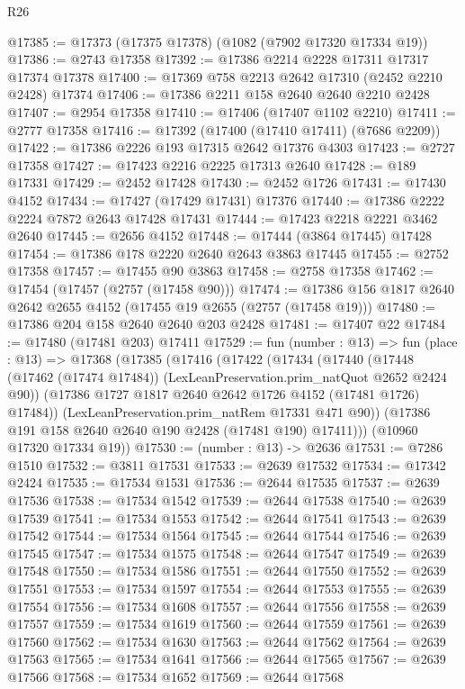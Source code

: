 \begin{lexlean}{R26}
\begin{coremodule}
@17385 := @17373 (@17375 @17378) (@1082 (@7902 @17320 @17334 @19))
@17386 := @2743 @17358
@17392 := @17386 @2214 @2228 @17311 @17317 @17374 @17378
@17400 := @17369 @758 @2213 @2642 @17310 (@2452 @2210 @2428) @17374
@17406 := @17386 @2211 @158 @2640 @2640 @2210 @2428
@17407 := @2954 @17358
@17410 := @17406 (@17407 @1102 @2210)
@17411 := @2777 @17358
@17416 := @17392 (@17400 (@17410 @17411) (@7686 @2209))
@17422 := @17386 @2226 @193 @17315 @2642 @17376 @4303
@17423 := @2727 @17358
@17427 := @17423 @2216 @2225 @17313 @2640
@17428 := @189 @17331
@17429 := @2452 @17428
@17430 := @2452 @1726
@17431 := @17430 @4152
@17434 := @17427 (@17429 @17431) @17376
@17440 := @17386 @2222 @2224 @7872 @2643 @17428 @17431
@17444 := @17423 @2218 @2221 @3462 @2640
@17445 := @2656 @4152
@17448 := @17444 (@3864 @17445) @17428
@17454 := @17386 @178 @2220 @2640 @2643 @3863 @17445
@17455 := @2752 @17358
@17457 := @17455 @90 @3863
@17458 := @2758 @17358
@17462 := @17454 (@17457 (@2757 (@17458 @90)))
@17474 := @17386 @156 @1817 @2640 @2642 @2655 @4152 (@17455 @19 @2655 (@2757 (@17458 @19)))
@17480 := @17386 @204 @158 @2640 @2640 @203 @2428
@17481 := @17407 @22
@17484 := @17480 (@17481 @203) @17411
@17529 := fun (number : @13) =>
  fun (place : @13) =>
  @17368
    (@17385
      (@17416
        (@17422
          (@17434
            (@17440
              (@17448 (@17462 (@17474 @17484)) (LexLeanPreservation.prim_natQuot @2652 @2424 @90))
              (@17386 @1727 @1817 @2640 @2642 @1726 @4152 (@17481 @1726) @17484))
            (LexLeanPreservation.prim_natRem @17331 @471 @90))
          (@17386 @191 @158 @2640 @2640 @190 @2428 (@17481 @190) @17411)))
      (@10960 @17320 @17334 @19))
@17530 := (number : @13) -> @2636
@17531 := @7286 @1510
@17532 := @3811 @17531
@17533 := @2639 @17532
@17534 := @17342 @2424
@17535 := @17534 @1531
@17536 := @2644 @17535
@17537 := @2639 @17536
@17538 := @17534 @1542
@17539 := @2644 @17538
@17540 := @2639 @17539
@17541 := @17534 @1553
@17542 := @2644 @17541
@17543 := @2639 @17542
@17544 := @17534 @1564
@17545 := @2644 @17544
@17546 := @2639 @17545
@17547 := @17534 @1575
@17548 := @2644 @17547
@17549 := @2639 @17548
@17550 := @17534 @1586
@17551 := @2644 @17550
@17552 := @2639 @17551
@17553 := @17534 @1597
@17554 := @2644 @17553
@17555 := @2639 @17554
@17556 := @17534 @1608
@17557 := @2644 @17556
@17558 := @2639 @17557
@17559 := @17534 @1619
@17560 := @2644 @17559
@17561 := @2639 @17560
@17562 := @17534 @1630
@17563 := @2644 @17562
@17564 := @2639 @17563
@17565 := @17534 @1641
@17566 := @2644 @17565
@17567 := @2639 @17566
@17568 := @17534 @1652
@17569 := @2644 @17568

\end{coremodule}
\end{lexlean}
